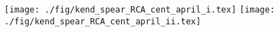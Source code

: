  \begin{figure}[H]
  \centering
\texttt{[image: ./fig/kend\_spear\_RCA\_cent\_april\_i.tex]}
\texttt{[image: ./fig/kend\_spear\_RCA\_cent\_april\_ii.tex]}
\end{figure}
\endinput

